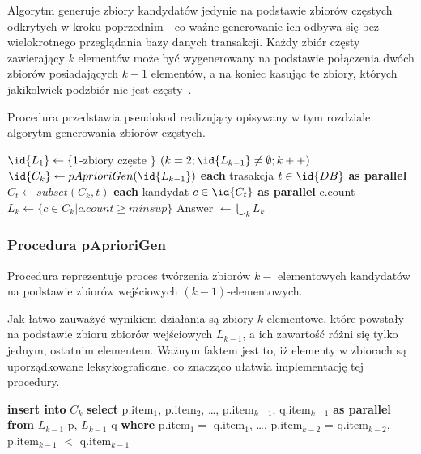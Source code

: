 Algorytm generuje zbiory kandydatów jedynie na podstawie zbiorów częstych odkrytych w kroku poprzednim - co ważne generowanie ich odbywa się bez wielokrotnego przeglądania bazy danych transakcji. Każdy zbiór częsty zawierający $k$ elementów może być wygenerowany na podstawie połączenia dwóch zbiorów posiadających $k-1$ elementów, a na koniec kasując te zbiory, których jakikolwiek podzbiór nie jest częsty~\cite{Apriori:Main}.

Procedura  przedstawia pseudokod realizujący opisywany w tym rozdziale algorytm generowania zbiorów częstych.

\begin{codebox}
	\label{apriori:listing}
	\li $\id{L_1} \gets \lbrace 1$-zbiory częste $\rbrace$
		\li \For $(k = 2; \id{L_{k-1}} \neq \emptyset; k++)$
		\li \Do
			 $\id{C_k} \gets pAprioriGen(\id{L_{k-1}})$
			\li \For \textbf{each} trasakcja $t \in \id{DB}$ \textbf{as parallel}
			\li \Do
					$C_t \gets subset(C_k, t)$
					\li \For \textbf{each} kandydat $c \in \id{C_t}$ \textbf{as parallel}
					\li \Do c.count++
					\End
				\End
			\li $L_k \gets \lbrace c \in C_k | c.count \geq minsup \rbrace$	
		\End
	\li Answer $\gets \bigcup_k L_k $
\end{codebox}

\subsubsection{Procedura pAprioriGen}

Procedura  reprezentuje proces twórzenia zbiorów $k-$ elementowych kandydatów na podstawie zbiorów wejściowych $(k-1)$-elementowych. 

Jak łatwo zauważyć wynikiem działania  są zbiory $k$-elementowe, które powstały na podstawie zbioru zbiorów wejściowych $L_{k-1}$, a ich zawartość różni się tylko jednym, ostatnim elementem. Ważnym faktem jest to, iż elementy w zbiorach są uporządkowane leksykograficzne, co znacząco ułatwia implementację tej procedury.

\begin{codebox}
	\li \textbf{insert into} $C_k$
	\li \textbf{select} p.item$_1$, p.item$_2$, \dots, p.item$_{k-1}$, q.item$_{k-1}$ \textbf{as parallel}
	\li \textbf{from} $L_{k-1}$ p, $L_{k-1}$ q
	\li \textbf{where} p.item$_1 = $ q.item$_1$, \dots, p.item$_{k-2}$ = q.item$_{k-2}$, p.item$_{k-1}$ $<$ q.item$_{k-1}$
\end{codebox}

